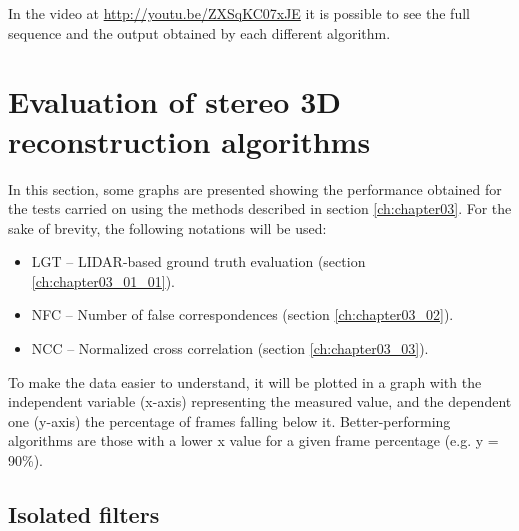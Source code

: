 In the video at \url{http://youtu.be/ZXSqKC07xJE} it is possible to see the full sequence and the output obtained by each different algorithm.


\graphicspath{{./images/chapter03/bmps/}{./images/chapter03/vects/}{./images/chapter03/}}
\section{Evaluation of stereo 3D reconstruction algorithms}\label{ch:chapter03_04}

In this section, some graphs are presented showing the performance obtained for the tests carried on using the methods described in section \ref{ch:chapter03}. For the sake of brevity, the following notations will be used:
\begin{itemize}
 \item LGT – LIDAR-based ground truth evaluation (section \ref{ch:chapter03_01_01}).
 \item NFC – Number of false correspondences (section \ref{ch:chapter03_02}).
 \item NCC – Normalized cross correlation (section \ref{ch:chapter03_03}).
\end{itemize}

To make the data easier to understand, it will be plotted in a graph with the independent variable (x-axis) representing the measured value, and the dependent one (y-axis) the percentage of frames falling below it. Better-performing algorithms are those with a lower x value for a given frame percentage (e.g. y = 90\%).

\subsection{Isolated filters}\label{ch:chapter03_04_01}

